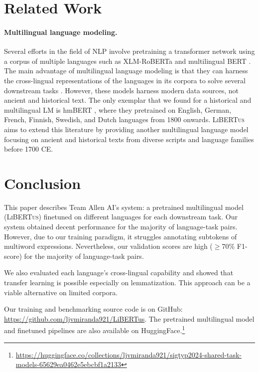 \documentclass[11pt]{article}
\newcommand{\libertus}{\textsc{LiBERTus}}
\newcommand{\teamname}{Allen AI}
\newcommand{\githuburl}{\url{https://github.com/ljvmiranda921/LiBERTus}}
\begin{document}
\section{Related Work}

\paragraph{Multilingual language modeling.} 
Several efforts in the field of NLP involve pretraining a transformer network \cite{vaswani-etal-2017-attention} using a corpus of multiple languages such as XLM-RoBERTa \cite{liu-etal-2019-roberta} and multilingual BERT \cite{conneau-etal-2020-unsupervised}.
The main advantage of multilingual language modeling is that they can harness the cross-lingual representations of the languages in its corpora to solve several downstream tasks \cite{chang-etal-2022-geometry}.
However, these models harness modern data sources, not ancient and historical text.
The only exemplar that we found for a historical and multilingual LM is hmBERT \cite{schweter-etal-2022-hmbert}, where they pretrained on English, German, French, Finnish, Swedish, and Dutch languages from 1800 onwards.
\libertus{} aims to extend this literature by providing another multilingual language model focusing on ancient and historical texts from diverse scripts and language families before 1700 CE.

\section{Conclusion}

This paper describes Team \teamname{}'s system: a pretrained multilingual model (\libertus{}) finetuned on different languages for each downstream task.
Our system obtained decent performance for the majority of language-task pairs.
However, due to our training paradigm, it struggles annotating subtokens of multiword expressions.
Nevertheless, our validation scores are high ($\geq$70\% F1-score) for the majority of language-task pairs.

We also evaluated each language's cross-lingual capability and showed that transfer learning is possible especially on lemmatization.
This approach can be a viable alternative on limited corpora.

Our training and benchmarking source code is on GitHub: \githuburl{}.
The pretrained multilingual model and finetuned pipelines are also available on HuggingFace.\footnote[2]{\url{https://huggingface.co/collections/ljvmiranda921/sigtyp2024-shared-task-models-65629ea0462e5ebcbf1a2133}}
\end{document}
